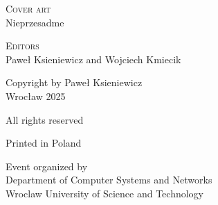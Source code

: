\documentclass[
    letterpaper,
    10pt,%
    printed,%
    twoside,
    twosidepapers,
    papers=countpages,%
    paperselec=all, %
    hyperref={
        bookmarksdepth=1,
        bookmarksopen,
        bookmarksopenlevel=0,%
        linkcolor=blue,urlcolor=blue
    },%
    geometry={
        text={122truemm,126truemm},%
        inner=1.85in,top=35.00mm,
        bottom=50.00mm,footskip=10.00mm,
        voffset=-5mm
    },
]{confproc}
\author{\procpdfauthor}
\title{\procpdftitle}
\date{\today}
\begin{document}
\pagecolor{black}


\pagecolor{white}

\noindent\textsc{Cover art}\\
Nieprzesadme

\vspace{1em}

\noindent\textsc{Editors}\\
Paweł Ksieniewicz and Wojciech Kmiecik

\vfill

\noindent\textcopyright\; Copyright by Paweł Ksieniewicz\\
Wrocław 2025

\vspace{1em}

\noindent All rights reserved

\vspace{1em}

\noindent Printed in Poland

\vspace{1em}


\vspace{1em}

\noindent Event organized by \\
Department of Computer Systems and Networks\\
Wroclaw University of Science and Technology


\frontmatter

\setcounter{page}{1}
\maketitle

\newpage

\otherpagestyle

\clearsingleordoublepage
\vspace*{0.6cm}
\thisotherpagestyle
{}
\end{document}
